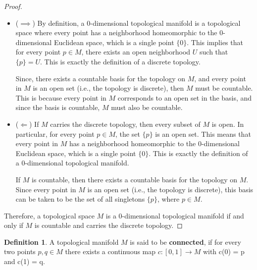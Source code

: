\documentclass[
]{book}
\theoremstyle{definition}
\newtheorem{definition}{Definition}[chapter]
\theoremstyle{definition}
\theoremstyle{definition}
\theoremstyle{definition}
\theoremstyle{remark}
\begin{document}
\begin{proof}
\leavevmode

\begin{itemize}
\item
  (\(\implies\)) By definition, a 0-dimensional topological manifold is a topological space where every point has a neighborhood homeomorphic to the 0-dimensional Euclidean space, which is a single point \(\{0\}\). This implies that for every point \(p \in M\), there exists an open neighborhood \(U\) such that \(\{p\} = U\). This is exactly the definition of a discrete topology.

  Since, there exists a countable basis for the topology on \(M\), and every point in \(M\) is an open set (i.e., the topology is discrete), then \(M\) must be countable. This is because every point in \(M\) corresponds to an open set in the basis, and since the basis is countable, \(M\) must also be countable.
\item
  (\(\Longleftarrow\)) If \(M\) carries the discrete topology, then every subset of \(M\) is open. In particular, for every point \(p \in M\), the set \(\{p\}\) is an open set. This means that every point in \(M\) has a neighborhood homeomorphic to the 0-dimensional Euclidean space, which is a single point \(\{0\}\). This is exactly the definition of a 0-dimensional topological manifold.

  If \(M\) is countable, then there exists a countable basis for the topology on \(M\). Since every point in \(M\) is an open set (i.e., the topology is discrete), this basis can be taken to be the set of all singletons \(\{p\}\), where \(p \in M\).
\end{itemize}

Therefore, a topological space \(M\) is a 0-dimensional topological manifold if and only if \(M\) is countable and carries the discrete topology.

\end{proof}

\begin{definition}
\protect\hypertarget{def:unnamed-chunk-15}{}\label{def:unnamed-chunk-15}A topological manifold \(M\) is said to be \textbf{connected}, if for every two points \(p, q \in M\) there exists a continuous map \(c : [0, 1] \to M\) with c(0) = p and c(1) = q.
\end{definition}
\end{document}
